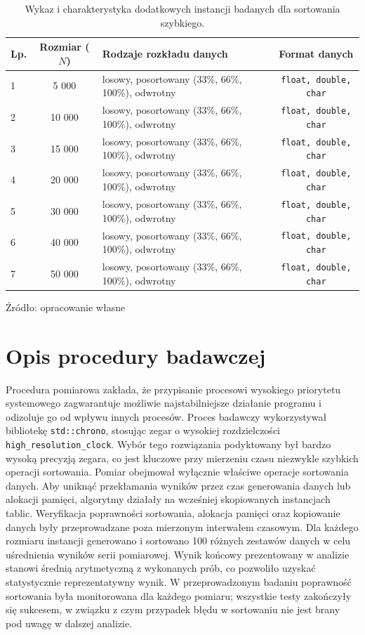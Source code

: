 \documentclass{article}
\begin{document}
  \begin{table}[h]
    \centering
    \caption{Wykaz i charakterystyka dodatkowych instancji badanych dla sortowania szybkiego.}
    \label{tab:instancje2}
    \begin{tabular}{|l|c|p{7cm}|c|}
      \hline
    \textbf{Lp.} & \textbf{Rozmiar ($N$)} & \textbf{Rodzaje rozkładu danych} & \textbf{Format danych} \\ \hline
    1 & 5 000  & losowy, posortowany (33\%, 66\%, 100\%), odwrotny & \texttt{float, double, char} \\ \hline
    2 & 10 000 & losowy, posortowany (33\%, 66\%, 100\%), odwrotny & \texttt{float, double, char} \\ \hline
    3 & 15 000 & losowy, posortowany (33\%, 66\%, 100\%), odwrotny & \texttt{float, double, char} \\ \hline
    4 & 20 000 & losowy, posortowany (33\%, 66\%, 100\%), odwrotny & \texttt{float, double, char} \\ \hline
    5 & 30 000 & losowy, posortowany (33\%, 66\%, 100\%), odwrotny & \texttt{float, double, char} \\ \hline
    6 & 40 000 & losowy, posortowany (33\%, 66\%, 100\%), odwrotny & \texttt{float, double, char} \\ \hline
    7 & 50 000 & losowy, posortowany (33\%, 66\%, 100\%), odwrotny & \texttt{float, double, char} \\ \hline
    \end{tabular}
    \small Źródło: opracowanie własne
  \end{table} 
  \clearpage
  \section{Opis procedury badawczej}
    Procedura pomiarowa zakłada,
    że przypisanie procesowi wysokiego priorytetu systemowego zagwarantuje możliwie
    najstabilniejsze działanie programu i odizoluje go od wpływu innych procesów.
    Proces badawczy wykorzystywał bibliotekę \texttt{std::chrono},
    stosując zegar o wysokiej rozdzielczości \texttt{high\_resolution\_clock}.
    Wybór tego rozwiązania podyktowany był bardzo wysoką precyzją zegara,
    co jest kluczowe przy mierzeniu czasu niezwykle szybkich operacji sortowania.
    Pomiar obejmował wyłącznie właściwe operacje sortowania danych.
    Aby uniknąć przekłamania wyników przez czas generowania danych lub alokacji pamięci,
    algorytmy działały na wcześniej skopiowanych instancjach tablic.
    Weryfikacja poprawności sortowania,
    alokacja pamięci oraz kopiowanie danych były przeprowadzane poza mierzonym interwałem
    czasowym. Dla każdego rozmiaru instancji generowano i sortowano 100 różnych zestawów
    danych w celu uśrednienia wyników serii pomiarowej.
    Wynik końcowy prezentowany w analizie stanowi średnią arytmetyczną z wykonanych prób,
    co pozwoliło uzyskać statystycznie reprezentatywny wynik.
    W przeprowadzonym badaniu poprawność sortowania była monitorowana dla każdego pomiaru;
    wszystkie testy zakończyły się sukcesem,
    w związku z czym przypadek błędu w sortowaniu nie jest brany pod uwagę w dalszej analizie.
\end{document}
